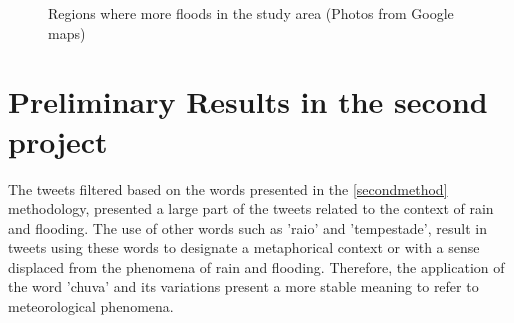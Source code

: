 \begin{figure}[H]
	\centering
	\caption{Regions where more floods in the study area (Photos from Google maps)}
	\label{fig:foobar}
\end{figure}

\section{Preliminary Results in the second project}
The tweets filtered based on the words presented in the \ref{secondmethod} methodology, presented a large part of the tweets related to the context of rain and flooding. The use of other words such as 'raio' and 'tempestade', result in tweets using these words to designate a metaphorical context or with a sense displaced from the phenomena of rain and flooding. Therefore, the application of the word 'chuva' and its variations present a more stable meaning to refer to meteorological phenomena.

